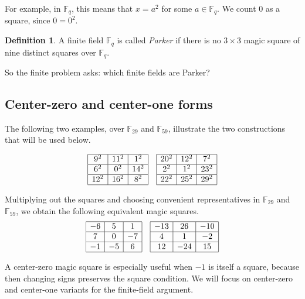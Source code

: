 \documentclass{article}
\newcommand{\F}{\mathbb F}
\theoremstyle{definition}
\newtheorem*{definition}{Definition}
\numberwithin{equation}{section}
\begin{document}
For example, in \(\F_q\), this means that \(x=a^2\) for some \(a\in\F_q\). We count \(0\) as a square, since
\(0=0^2\).

\begin{definition}
A finite field \(\F_q\) is called \emph{Parker} if there is no \(3\times3\)
magic square of nine distinct squares over \(\F_q\).
\end{definition}

So the finite problem asks: which finite fields are Parker?

\subsection{Center-zero and center-one forms}

The following two examples, over \(\F_{29}\) and \(\F_{59}\), illustrate the two constructions that will be used below.

\[
\begin{array}{|c|c|c|}
\hline
9^2 & 11^2 & 1^2\\
\hline
6^2 & 0^2 & 14^2\\
\hline
12^2 & 16^2 & 8^2\\
\hline
\end{array}
\quad
\begin{array}{|c|c|c|}
\hline
20^2 & 12^2 & 7^2\\
\hline
2^2 & 1^2 & 23^2\\
\hline
22^2 & 25^2 & 29^2\\
\hline
\end{array}
\]

Multiplying out the squares and choosing convenient representatives in \(\F_{29}\) and \(\F_{59}\), we obtain the following equivalent magic squares.
\[
\begin{array}{|c|c|c|}
\hline
-6 & 5 & 1\\
\hline
7 & 0 & -7\\
\hline
-1 & -5 & 6\\
\hline
\end{array}
\quad
\begin{array}{|c|c|c|}
\hline
-13 & 26 & -10\\
\hline
4 & 1 & -2\\
\hline
12 & -24 & 15\\
\hline
\end{array}
\]

A center-zero magic square is especially useful when \(-1\) is itself a square, because then changing signs preserves the square condition. We will focus on center-zero and center-one variants for the finite-field argument.
\end{document}
